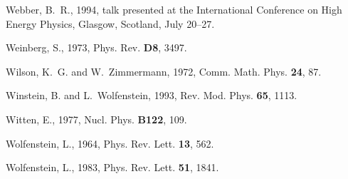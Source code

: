 \begin{thebibliography}{\protect{}1991}
Webber, B.~R., 1994,
\newblock talk presented at the International Conference on High Energy
  Physics, Glasgow, Scotland, July 20--27.

Weinberg, S., 1973,
\newblock Phys. Rev. {\bf D8}, 3497.

Wilson, K.~G. and W.~Zimmermann, 1972,
\newblock Comm. Math. Phys. {\bf 24}, 87.

Winstein, B. and L.~Wolfenstein, 1993,
\newblock Rev. Mod. Phys. {\bf 65}, 1113.

Witten, E., 1977,
\newblock Nucl. Phys. {\bf B122}, 109.

Wolfenstein, L., 1964,
\newblock Phys. Rev. Lett. {\bf 13}, 562.

Wolfenstein, L., 1983,
\newblock Phys. Rev. Lett. {\bf 51}, 1841.

\end{thebibliography}


